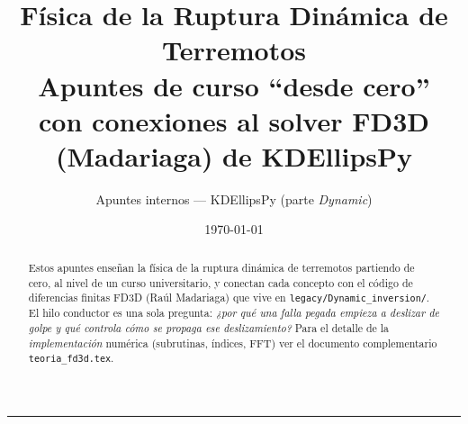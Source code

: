 \documentclass[11pt,a4paper]{article}
\title{\textbf{Física de la Ruptura Dinámica de Terremotos}\\[4pt]
       \large Apuntes de curso ``desde cero'' \\
       \normalsize con conexiones al solver FD3D (Madariaga) de KDEllipsPy}
\author{Apuntes internos --- KDEllipsPy (parte \emph{Dynamic})}
\date{\today}
\begin{document}
\maketitle

\begin{abstract}
\noindent
Estos apuntes enseñan la física de la ruptura dinámica de terremotos partiendo
de cero, al nivel de un curso universitario, y conectan cada concepto con el
código de diferencias finitas FD3D (Raúl Madariaga) que vive en
\texttt{legacy/Dynamic\_inversion/}. El hilo conductor es una sola pregunta:
\emph{¿por qué una falla pegada empieza a deslizar de golpe y qué controla cómo
se propaga ese deslizamiento?} Para el detalle de la \emph{implementación}
numérica (subrutinas, índices, FFT) ver el documento complementario
\texttt{teoria\_fd3d.tex}.
\end{abstract}

\tableofcontents
\bigskip
\hrule

\end{document}

